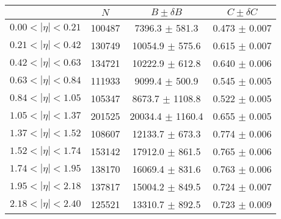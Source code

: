 \begin{tabular}{lccc}
\hline
    &   $N$   & $B \pm \delta B$  &  $C \pm \delta C$ \\
\hline
$0.00 < |\eta| <0.21$          & 100487     & 7396.3     $\pm$ 581.3 & 0.473      $\pm$ 0.007 \\
$0.21 < |\eta| <0.42$          & 130749     & 10054.9    $\pm$ 575.6 & 0.615      $\pm$ 0.007 \\
$0.42 < |\eta| <0.63$          & 134721     & 10222.9    $\pm$ 612.8 & 0.640      $\pm$ 0.006 \\
$0.63 < |\eta| <0.84$          & 111933     & 9099.4     $\pm$ 500.9 & 0.545      $\pm$ 0.005 \\
$0.84 < |\eta| <1.05$          & 105347     & 8673.7     $\pm$ 1108.8 & 0.522      $\pm$ 0.005 \\
$1.05 < |\eta| <1.37$          & 201525     & 20034.4    $\pm$ 1160.4 & 0.655      $\pm$ 0.005 \\
$1.37 < |\eta| <1.52$          & 108607     & 12133.7    $\pm$ 673.3 & 0.774      $\pm$ 0.006 \\
$1.52 < |\eta| <1.74$          & 153142     & 17912.0    $\pm$ 861.5 & 0.765      $\pm$ 0.006 \\
$1.74 < |\eta| <1.95$          & 138170     & 16069.4    $\pm$ 831.6 & 0.763      $\pm$ 0.006 \\
$1.95 < |\eta| <2.18$          & 137817     & 15004.2    $\pm$ 849.5 & 0.724      $\pm$ 0.007 \\
$2.18 < |\eta| <2.40$          & 125521     & 13310.7    $\pm$ 892.5 & 0.723      $\pm$ 0.009 \\
\hline
\end{tabular}
